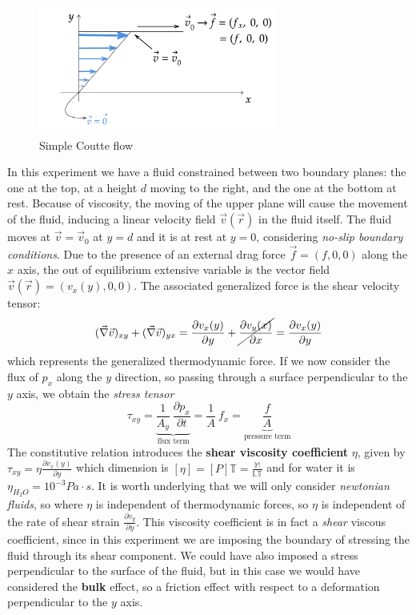 \documentclass[../main/main.tex]{subfiles}
\begin{document}
\begin{figure}[h!]
    \centering
    \includegraphics[width=0.7\textwidth]{../frontespizio/tikz/5_lesson/couette.png}
    \caption{Simple Coutte flow}
\end{figure}
In this experiment we have a fluid constrained between two boundary planes: the one at the top, at a height $d$ moving to the right, and the one at the bottom at rest. Because of viscosity, the moving of the upper plane will cause the movement of the fluid, inducing a linear velocity field $\vec{v}(\vec{r})$ in the fluid itself. The fluid moves at $\vec{v}=\vec{v}_0$ at $y=d$ and it is at rest at $y=0$, considering \emph{no-slip boundary conditions}.
Due to the presence of an external drag force $\vec{f}=(f, 0, 0)$ along the $x$ axis, the out of equilibrium extensive variable is the vector field $\vec{v}(\vec{r})=(v_x(y), 0, 0)$. The associated generalized force is the shear velocity tensor:
\begin{equation*}
    (\vec{\nabla}\vec{v})_{xy} + (\vec{\nabla}\vec{v})_{yx} = \frac{\partial v_x(y)}{\partial y}+\cancel{\frac{\partial v_y(x)}{\partial x}} = \frac{\partial v_x(y)}{\partial y}
\end{equation*} 
which represents the generalized thermodynamic force. If we now consider the flux of $p_x$ along the $y$ direction, so passing through a surface perpendicular to the $y$ axis, we obtain the \emph{stress tensor} 
\begin{equation}
    \tau_{xy} =\underbrace{\frac{1}{A_y}\:\frac{\partial p_x}{\partial t}}_{\text{flux term}} = \frac{1}{A}\: f_x = \underbrace{\frac{f}{A}}_{\text{pressure term}} 
    \label{eq_constitutive_equation}
\end{equation} 
The constitutive relation introduces the \textbf{shear viscosity coefficient} $\eta$, given by $\tau_{xy}=\eta \frac{\partial v_x(y)}{\partial y}$ which dimension is $[\eta]=[P]\mathbb{T}=\frac{\mathbb{M}}{\mathbb{LT}}$ and for water it is $\eta_{H_2 O}=10^{-3}Pa\cdot s$.
It is worth underlying that we will only consider \emph{newtonian fluids}, so where $\eta$ is independent of thermodynamic forces, so $\eta$ is independent of the rate of shear strain $\frac{\partial v_y}{\partial y}$. This viscosity coefficient is in fact a \emph{shear} viscous coefficient, since in this experiment we are imposing the boundary of stressing the fluid through its shear component. We could have also imposed a stress perpendicular to the surface of the fluid, but in this case we would have considered the \textbf{bulk} effect, so a friction effect with respect to a deformation perpendicular to the $y$ axis.
\end{document}
